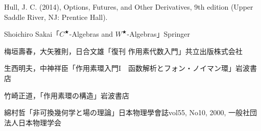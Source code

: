 \begin{thebibliography}{9}
\item Hull, J. C. (2014), Options, Futures, and Other Derivatives, 9th edition (Upper Saddle River, NJ: Prentice Hall).
\item Shoichiro Sakai「$C^★$-Algebras and $W^★$-Algebras」Springer
\item 梅垣壽春，大矢雅則，日合文雄「復刊 作用素代数入門」共立出版株式会社
\item 生西明夫，中神祥臣「作用素環入門I　函数解析とフォン・ノイマン環」岩波書店
\item 竹崎正道，「作用素環の構造」岩波書店
\item 綿村哲「非可換幾何学と場の理論」日本物理學會誌vol55, No10, 2000, 一般社団法人日本物理学会
\end{thebibliography}
